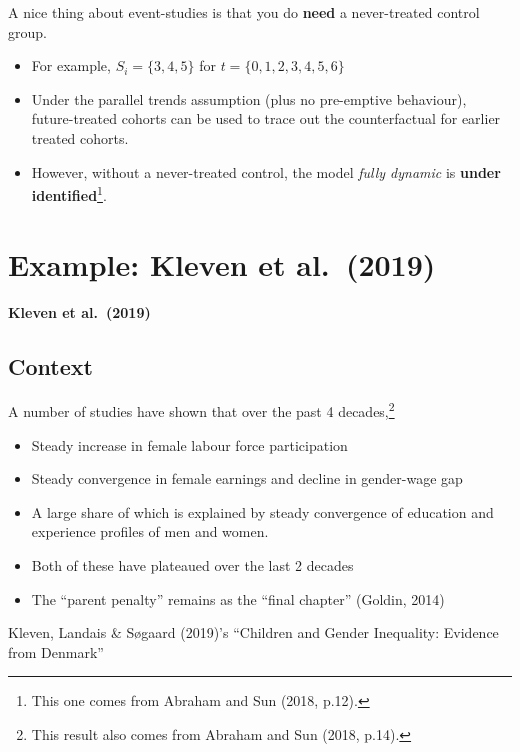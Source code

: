 \documentclass[
  letterpaper,
  DIV=11,
  numbers=noendperiod]{scrreprt}
\providecommand{\tightlist}{%
  \setlength{\itemsep}{0pt}\setlength{\parskip}{0pt}}\usepackage{longtable,booktabs,array}
\theoremstyle{definition}
\theoremstyle{remark}
\begin{document}
A nice thing about event-studies is that you do \textbf{need} a
never-treated control group.

\begin{itemize}
\tightlist
\item
  For example, \(S_i = \{3,4,5\}\) for \(t=\{0,1,2,3,4,5,6\}\)
\item
  Under the parallel trends assumption (plus no pre-emptive behaviour),
  future-treated cohorts can be used to trace out the counterfactual for
  earlier treated cohorts.
\item
  However, without a never-treated control, the model \emph{fully
  dynamic} is \textbf{under identified}\footnote{This one comes from
    Abraham and Sun (2018, p.12).}.
\end{itemize}

\hypertarget{example-kleven-et-al.-2019}{%
\chapter{Example: Kleven et
al.~(2019)}\label{example-kleven-et-al.-2019}}

\textbf{Kleven et al.~(2019)}

\hypertarget{context}{%
\section{Context}\label{context}}

A number of studies have shown that over the past 4 decades,\footnote{This
  result also comes from Abraham and Sun (2018, p.14).}

\begin{itemize}
\tightlist
\item
  Steady increase in female labour force participation
\item
  Steady convergence in female earnings and decline in gender-wage gap
\item
  A large share of which is explained by steady convergence of education
  and experience profiles of men and women.
\item
  Both of these have plateaued over the last 2 decades
\item
  The ``parent penalty'' remains as the ``final chapter'' (Goldin, 2014)
\end{itemize}

Kleven, Landais \& Søgaard (2019)'s ``Children and Gender Inequality:
Evidence from Denmark''
\end{document}
